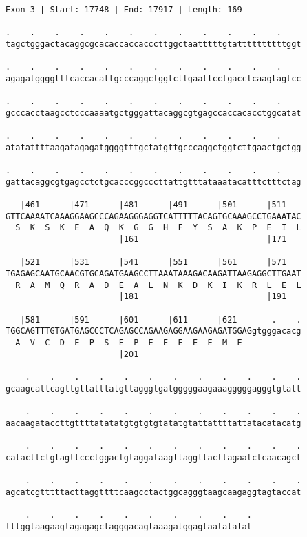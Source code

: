 \documentclass{article}
\begin{document}
\newpage
\begin{Verbatim}
Exon 3 | Start: 17748 | End: 17917 | Length: 169
 
.    .    .    .    .    .    .    .    .    .    .    .    
tagctgggactacaggcgcacaccaccacccttggctaatttttgtattttttttttggt
  
.    .    .    .    .    .    .    .    .    .    .    .    
agagatggggtttcaccacattgcccaggctggtcttgaattcctgacctcaagtagtcc
  
.    .    .    .    .    .    .    .    .    .    .    .    
gcccacctaagcctcccaaaatgctgggattacaggcgtgagccaccacacctggcatat
  
.    .    .    .    .    .    .    .    .    .    .    .    
atatattttaagatagagatggggtttgctatgttgcccaggctggtcttgaactgctgg
  
.    .    .    .    .    .    .    .    .    .    .    .    
gattacaggcgtgagcctctgcacccggcccttattgtttataaatacatttctttctag
  
   |461      |471      |481      |491      |501      |511   
GTTCAAAATCAAAGGAAGCCCAGAAGGGAGGTCATTTTTACAGTGCAAAGCCTGAAATAC
  S  K  S  K  E  A  Q  K  G  G  H  F  Y  S  A  K  P  E  I  L
                       |161                          |171   
  
   |521      |531      |541      |551      |561      |571   
TGAGAGCAATGCAACGTGCAGATGAAGCCTTAAATAAAGACAAGATTAAGAGGCTTGAAT
  R  A  M  Q  R  A  D  E  A  L  N  K  D  K  I  K  R  L  E  L
                       |181                          |191   
  
   |581      |591      |601      |611      |621       .    .
TGGCAGTTTGTGATGAGCCCTCAGAGCCAGAAGAGGAAGAAGAGATGGAGgtgggacacg
  A  V  C  D  E  P  S  E  P  E  E  E  E  E  M  E            
                       |201                                 
  
    .    .    .    .    .    .    .    .    .    .    .    .
gcaagcattcagttgttatttatgttagggtgatgggggaagaaagggggagggtgtatt
  
    .    .    .    .    .    .    .    .    .    .    .    .
aacaagataccttgttttatatatgtgtgtgtatatgtattattttattatacatacatg
  
    .    .    .    .    .    .    .    .    .    .    .    .
catacttctgtagttccctggactgtaggataagttaggttacttagaatctcaacagct
  
    .    .    .    .    .    .    .    .    .    .    .    .
agcatcgtttttacttaggttttcaagcctactggcagggtaagcaagaggtagtaccat
  
    .    .    .    .    .    .    .    .    .    .
tttggtaagaagtagagagctagggacagtaaagatggagtaatatatat
\end{Verbatim}
\end{document}

